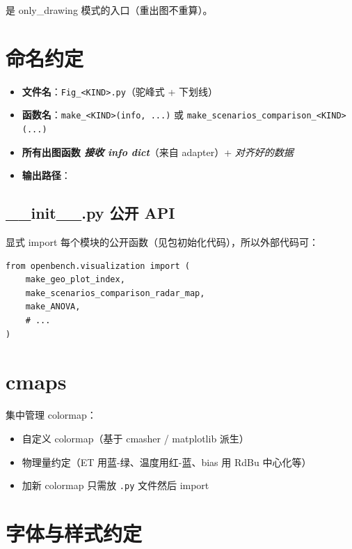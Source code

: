  是 only\_drawing 模式的入口（重出图不重算）。

\section{命名约定}

\begin{itemize}
  \item \textbf{文件名}：\texttt{Fig\_<KIND>.py}（驼峰式 + 下划线）
  \item \textbf{函数名}：\texttt{make\_<KIND>(info, ...)} 或 \texttt{make\_scenarios\_comparison\_<KIND>(...)}
  \item \textbf{所有出图函数 \emph{接收 info dict}}（来自 adapter）+ \emph{对齐好的数据}
  \item \textbf{输出路径}：
\end{itemize}

\subsection{__init__.py 公开 API}

 显式 import 每个模块的公开函数（见包初始化代码），所以外部代码可：

\begin{verbatim}
from openbench.visualization import (
    make_geo_plot_index,
    make_scenarios_comparison_radar_map,
    make_ANOVA,
    # ...
)
\end{verbatim}

\section{cmaps}

 集中管理 colormap：

\begin{itemize}
  \item 自定义 colormap（基于 cmasher / matplotlib 派生）
  \item 物理量约定（ET 用蓝-绿、温度用红-蓝、bias 用 RdBu 中心化等）
  \item 加新 colormap 只需放 \texttt{.py} 文件然后 import
\end{itemize}

\section{字体与样式约定}

